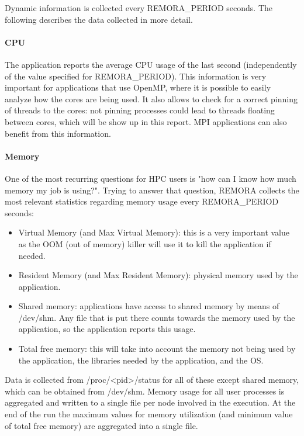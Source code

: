 \documentclass[10pt,a4paper]{report}
\begin{document}
Dynamic information is collected every REMORA\_PERIOD seconds. The following describes the data collected in more detail. 

\paragraph{CPU}
The application reports the average CPU usage of the last second (independently of the value specified for REMORA\_PERIOD). This information is very important for applications that use OpenMP, where it is possible to easily analyze how the cores are being used. It also allows to check for a correct pinning of threads to the cores: not pinning processes could lead to threads floating between cores, which will be show up in this report. MPI applications can also benefit from this information.

\paragraph{Memory}
One of the most recurring questions for HPC users is "how can I know how much memory my job is using?". Trying to answer that question, REMORA collects the most relevant statistics regarding memory usage every REMORA\_PERIOD seconds:

\begin{itemize}
\item Virtual Memory (and Max Virtual Memory): this is a very important value as the OOM (out of memory) killer will use it to kill the application if needed.
\item Resident Memory (and Max Resident Memory): physical memory used by the application.
\item Shared memory: applications have access to shared memory by means of /dev/shm. Any file that is put there counts towards the memory used by the application, so the application reports this usage.
\item Total free memory: this will take into account the memory not being used by the application, the libraries needed by the application, and the OS.
\end{itemize}

Data is collected from /proc/\textless pid\textgreater /status for all of these except shared memory, which can be obtained from /dev/shm. Memory usage for all user processes is aggregated and written to a single file per node involved in the execution. At the end of the run the maximum values for memory utilization (and minimum value of total free memory) are aggregated into a single file.
\end{document}
